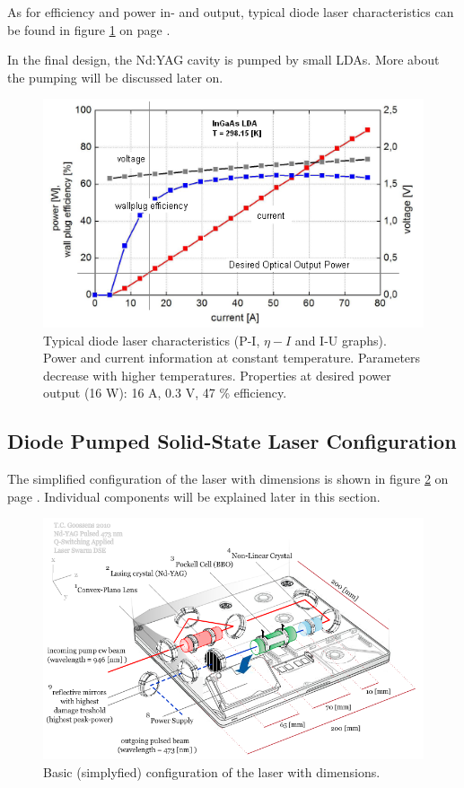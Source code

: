 As for efficiency and power in- and output, typical diode laser characteristics can be found in figure \ref{diode_laser_char} on page \pageref{diode_laser_char}.

In the final design, the Nd:YAG cavity is pumped by small \acp{LDA}. More about the pumping will be discussed later on.

\begin{figure} [ht]
\centering
\includegraphics[scale=0.5]{chapters/img/laser_power.png}	
\caption{Typical diode \acs{laser} characteristics (P-I, $\eta-I$ and I-U graphs). Power and current information at constant temperature. Parameters decrease with higher temperatures. Properties at desired power output (16 W): 16 A, 0.3 V, 47 \% efficiency.}
\label{diode_laser_char}
\end{figure}

\subsection{Diode Pumped Solid-State Laser Configuration} 
\label{laserconfig}

The simplified configuration of the \acs{laser} with dimensions is shown in figure \ref{laser_dimension} on page \pageref{laser_dimension}. Individual components will be explained later in this section.

\begin{figure} [ht]
\centering
\includegraphics[scale=0.5]{chapters/img/laserconfig.png}	
\caption{Basic (simplyfied) configuration of the \acs{laser} with dimensions.}
\label{laser_dimension}
\end{figure}

